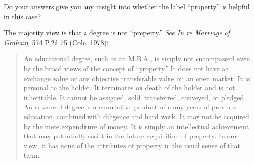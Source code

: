 Do your answers give you any insight into whether the label ``property'' is
helpful in this case?

\item
The majority view is that a degree is not ``property.'' \textit{See In re
Marriage of Graham}, 574 P.2d 75 (Colo. 1978):
\begin{quote}
An educational degree, such as an M.B.A., is simply not encompassed even by the
broad views of the concept of ``property.'' It does not have an exchange value
or
any objective transferable value on an open market. It is personal to the
holder. It terminates on death of the holder and is not inheritable. It cannot
be assigned, sold, transferred, conveyed, or pledged. An advanced degree is a
cumulative product of many years of previous education, combined with diligence
and hard work. It may not be acquired by the mere expenditure of money. It is
simply an intellectual achievement that may potentially assist in the future
acquisition of property. In our view, it has none of the attributes of property
in the usual sense of that term.
\end{quote}

